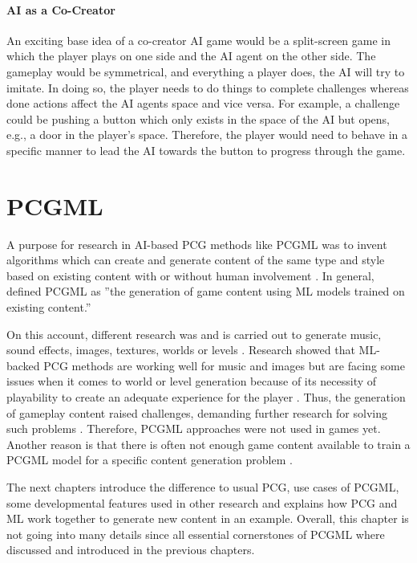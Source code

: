 \documentclass[MGS,Master,english]{twbook}%
\begin{document}
\subsubsection{\acl{AI} as a Co-Creator}
An exciting base idea of a co-creator \ac{AI} game would be a split-screen game in which the player plays on one side and the \ac{AI} agent on the other side. The gameplay would be symmetrical, and everything a player does, the \ac{AI} will try to imitate. In doing so, the player needs to do things to complete challenges whereas done actions affect the \ac{AI} agents space and vice versa. For example, a challenge could be pushing a button which only exists in the space of the \ac{AI} but opens, e.g., a door in the player's space. Therefore, the player would need to behave in a specific manner to lead the \ac{AI} towards the button to progress through the game.

%
%
\clearpage
\chapter{\acl{PCGML}}
A purpose for research in \ac{AI}-based \ac{PCG} methods like \ac{PCGML} was to invent algorithms which can create and generate content of the same type and style based on existing content with or without human involvement \cite{ai::book} \cite{pcgml::paper}. In general, \citep{pcgml::paper} defined \ac{PCGML} as ''the generation of game content using \ac{ML} models trained on existing content.'' 

On this account, different research was and is carried out to generate music, sound effects, images, textures, worlds or levels \cite{ai::book}. Research showed that \ac{ML}-backed \ac{PCG} methods are working well for music and images but are facing some issues when it comes to world or level generation because of its necessity of playability to create an adequate experience for the player \cite{ai::book}. Thus, the generation of gameplay content raised challenges, demanding further research for solving such problems \cite{ai::book}. Therefore, \ac{PCGML} approaches were not used in games yet. Another reason is that there is often not enough game content available to train a \ac{PCGML} model for a specific content generation problem \cite{ai::book}. 

The next chapters introduce the difference to usual \ac{PCG}, use cases of \ac{PCGML}, some developmental features used in other research and explains how \ac{PCG} and \ac{ML} work together to generate new content in an example. Overall, this chapter is not going into many details since all essential cornerstones of \ac{PCGML} where discussed and introduced in the previous chapters.
\end{document}
